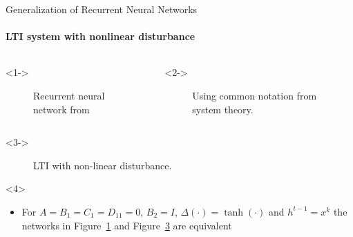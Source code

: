 \documentclass[8pt, t,
aspectratio=169,%
]{beamer}
\begin{document}
\begin{frame}{Generalization of Recurrent Neural Networks}
    \framesubtitle{LTI system with nonlinear disturbance}
    \vspace{-0.5cm}
    \begin{columns}
        \begin{onlyenv}<1->
            \begin{figure}
                \centering
                
                \caption{Recurrent neural network from \cite{goodfellow2016deep}}
                \label{fig:rnn}
            \end{figure}
        \end{onlyenv}
    
        \begin{onlyenv}<2->
            \begin{figure}
                \centering
                
                \caption{Using common notation from system theory.}
                \label{fig:rnn_intermediate}
            \end{figure}
        \end{onlyenv}
    \end{columns}

    \begin{onlyenv}<3->
        \begin{figure}
            \centering
            
            \caption{LTI with non-linear disturbance.}
            \label{fig:lti}
        \end{figure}  
        \vspace{-0.3cm}  
        \vfill
        \begin{onlyenv}<4>
            \begin{block}{}
                \begin{itemize}
                    \item For $A=B_1=C_1=D_{11} = 0$, $B_2 = I$, $\Delta(\cdot) = \tanh(\cdot)$ and $h^{t-1} = x^k$ the networks in Figure~\ref{fig:rnn} and Figure~\ref{fig:lti} are equivalent
                \end{itemize}
            \end{block}
        \end{onlyenv}

    \end{onlyenv}
\end{frame}
\end{document}
